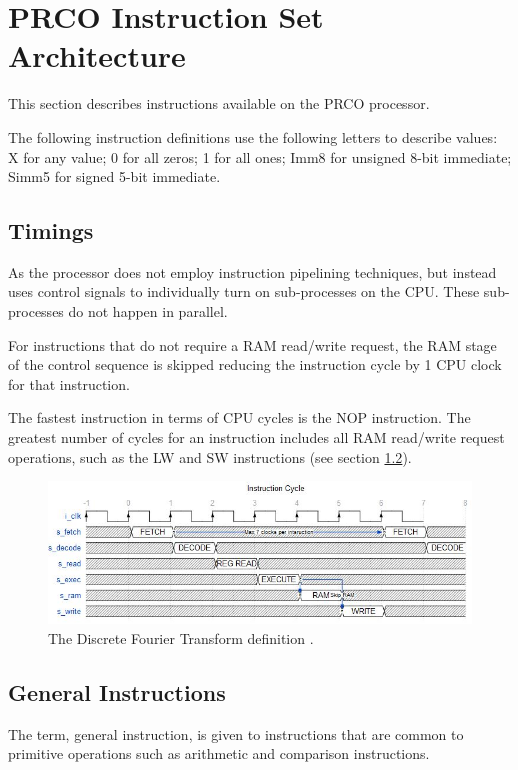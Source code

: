 \documentclass[11pt,a4paper]{article}
\newcommand{\scname}{PRCO}
\begin{document}
\newpage
\section{\scname{} Instruction Set Architecture}
This section describes instructions available on the \scname{} processor.

The following instruction definitions use the following letters to describe values: X for any value; 0 for all zeros; 1 for all ones; Imm8 for unsigned 8-bit immediate; Simm5 for signed 5-bit immediate.

\subsection{Timings}\label{sect:isa_timings}
As the processor does not employ instruction pipelining techniques, but instead uses control signals to individually turn on sub-processes on the CPU. These sub-processes do not happen in parallel. 

For instructions that do not require a RAM read/write request, the RAM stage of the control sequence is skipped reducing the instruction cycle by 1 CPU clock for that instruction.

The fastest instruction in terms of CPU cycles is the NOP instruction. The greatest number of cycles for an instruction includes all RAM read/write request operations, such as the LW and SW instructions (see section \ref{sect:isa_general}).

\begin{figure}[H]
\begin{center}
\includegraphics[scale=0.8]{td_instr}
\end{center}
\caption{The Discrete Fourier Transform definition \citep{wikipedia:dft}.}
\label{fig:dft_algorithm}
\end{figure}

\subsection{General Instructions} \label{sect:isa_general}
The term, general instruction, is given to instructions that are common to primitive operations such as arithmetic and comparison instructions.
\end{document}
